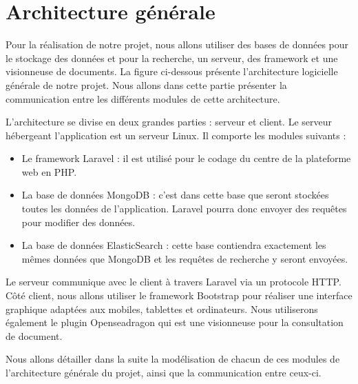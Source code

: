 \section{Architecture générale}
\label{sec:generale}

Pour la réalisation de notre projet, nous allons utiliser des bases de données pour le stockage des données et pour la recherche, un serveur, des framework et une visionneuse de documents. La figure ci-dessous présente l'architecture logicielle générale de notre projet. Nous allons dans cette partie présenter la communication entre les différents modules de cette architecture.

L'architecture se divise en deux grandes parties : serveur et client. 
Le serveur hébergeant l'application est un serveur Linux. Il comporte les modules suivants :
\begin{itemize}
	\item Le framework Laravel : il est utilisé pour le codage du centre de la plateforme web en PHP.
	\item La base de données MongoDB : c'est dans cette base que seront stockées toutes les données de l'application. Laravel pourra donc envoyer des requêtes pour modifier des données.
	\item La base de données ElasticSearch : cette base contiendra exactement les mêmes données que MongoDB et les requêtes de recherche y seront envoyées.
\end{itemize}

Le serveur communique avec le client à travers Laravel via un protocole HTTP. Côté client, nous allons utiliser le framework Bootstrap pour réaliser une interface graphique adaptées aux mobiles, tablettes et ordinateurs. Nous utiliserons également le plugin Openseadragon qui est une visionneuse pour la consultation de document. 

Nous allons détailler dans la suite la modélisation de chacun de ces modules de l'architecture générale du projet, ainsi que la communication entre ceux-ci.
